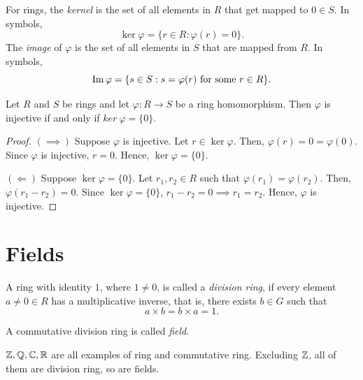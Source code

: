 \begin{definition}
    For rings, the \textit{kernel} is the set of all elements in $R$ that get mapped to $0 \in S$. In symbols,
    \[\ker \varphi = \{r \in R: \varphi(r) = 0\}.\]
    The \textit{image} of $\varphi$ is the set of all elements in $S$ that are mapped from $R$. In symbols,
    \[\operatorname{Im} \varphi = \{s \in S: s=\varphi(r) \text{ for some } r \in R\}.\]
\end{definition}

\begin{theorem}\label{thm:ringinjker}
    Let $R$ and $S$ be rings and let $\varphi: R \rightarrow S$ be a ring homomorphism. Then $\varphi$ is injective if and only if $ker \ \varphi = \{0\}$.
\end{theorem}
\begin{proof}
    $(\implies)$ Suppose $\varphi$ is injective. Let $r \in \ker \varphi$. Then, $\varphi(r) = 0 = \varphi(0)$. Since $\varphi$ is injective, $r = 0$. Hence, $\ker \varphi = \{0\}$.

    $(\Leftarrow)$ Suppose $\ker \varphi = \{0\}$. Let $r_1, r_2 \in R$ such that $\varphi(r_1) = \varphi(r_2)$. Then, $\varphi(r_1 - r_2) = 0$. Since $\ker \varphi = \{0\}$, $r_1 - r_2 = 0 \implies r_1 = r_2$. Hence, $\varphi$ is injective.
\end{proof}

\section{Fields}
\begin{definition}
    A ring with identity $1$, where $1 \neq 0$, is called a \textit{division ring}, if every element $a \neq 0 \in R$ has a multiplicative inverse, that is, there exists $b \in G$ such that
    \[a \times b = b \times a = 1.\] 
\end{definition}
\begin{definition}[Field]
    A commutative division ring is called \textit{field}.
\end{definition}
\begin{eg}
    $\mathbb{Z}, \mathbb{Q}, \mathbb{C}, \mathbb{R}$ are all examples of ring and commutative ring. Excluding $\mathbb{Z}$, all of them are division ring, so are fields.
\end{eg}